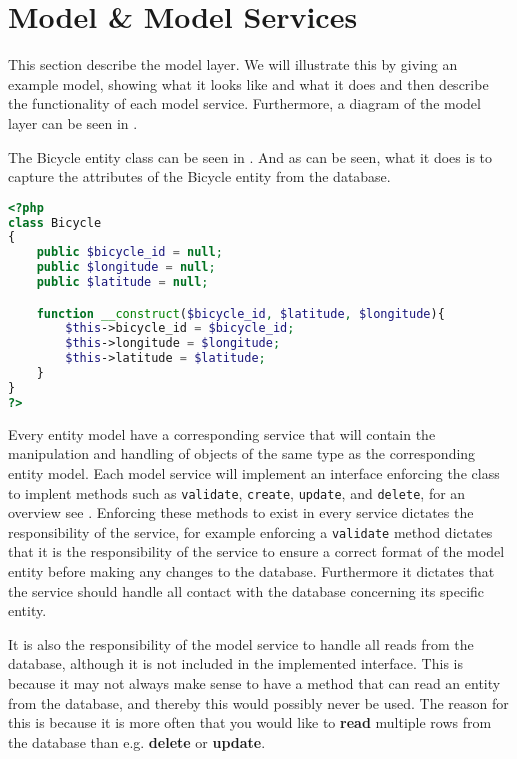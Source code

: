 \section{Model \& Model Services}
This section describe the model layer. 
We will illustrate this by giving an example model, showing what it looks like and what it does and then describe the functionality of each model service.
Furthermore, a diagram of the model layer can be seen in .

The Bicycle entity class can be seen in .
And as can be seen, what it does is to capture the attributes of the Bicycle entity from the database.

\begin{minipage}{\textwidth}
\begin{lstlisting}[language=php, label=lst:bicycleModel, caption={Bicycle Class}]
<?php
class Bicycle
{
    public $bicycle_id = null;
    public $longitude = null;
    public $latitude = null;

    function __construct($bicycle_id, $latitude, $longitude){
        $this->bicycle_id = $bicycle_id;
        $this->longitude = $longitude;
        $this->latitude = $latitude;
    }
}
?>
\end{lstlisting}
\end{minipage}

Every entity model have a corresponding service that will contain the manipulation and handling of objects of the same type as the corresponding entity model. 
Each model service will implement an interface enforcing the class to implent methods such as \texttt{validate}, \texttt{create}, \texttt{update}, and \texttt{delete}, for an overview see . 
Enforcing these methods to exist in every service dictates the responsibility of the service, for example enforcing a \texttt{validate} method dictates that it is the responsibility of the service to ensure a correct format of the model entity before making any changes to the database. 
Furthermore it dictates that the service should handle all contact with the database concerning its specific entity.

It is also the responsibility of the model service to handle all reads from the database, although it is not included in the implemented interface.
This is because it may not always make sense to have a method that can read an entity from the database, and thereby this would possibly never be used.
The reason for this is because it is more often that you would like to \textbf{read} multiple rows from the database than e.g. \textbf{delete} or \textbf{update}.

